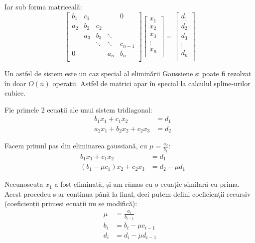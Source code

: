 \documentclass{exam}
\begin{document}
Iar sub forma matriceală:
\begin{equation*}
	\begin{bmatrix}
		b_1 & c_1 &        &        & 0         \\
		a_2 & b_2 & c_2    &        &           \\
		    & a_3 & b_3    & \ddots &           \\
		    &     & \ddots & \ddots & c_{n - 1} \\
		0   &     &        & a_n    & b_n       \\
	\end{bmatrix}
	\begin{bmatrix}
		x_1    \\
		x_2    \\
		x_3    \\
		\vdots \\
		x_n    \\
	\end{bmatrix}
	=
	\begin{bmatrix}
		d_1    \\
		d_2    \\
		d_3    \\
		\vdots \\
		d_n    \\
	\end{bmatrix}
\end{equation*}

Un astfel de sistem este un caz special al eliminării Gaussiene și poate fi
rezolvat în doar $O(n)$ operații. Astfel de matrici apar în special la calculul
spline-urilor cubice.

Fie primele 2 ecuații ale unui sistem tridiagonal:
\begin{align*}
	 & b_1 x_1 + c_1 x_2           & = d_1 \\
	 & a_2 x_1 + b_2 x_2 + c_2 x_3 & = d_2
\end{align*}

Facem primul pas din eliminarea gaussiană, cu $\mu = \frac{a_2}{b_1}$:
\begin{align*}
	 & b_1 x_1 + c_1 x_2             & = d_1           \\
	 & (b_1 - \mu c_1) x_2 + c_2 x_3 & = d_2 - \mu d_1
\end{align*}

Necunoscuta $x_1$ a fost eliminată, și am rămas cu o ecuație similară cu prima.
Acest procedeu s-ar continua până la final, deci putem defini coeficienții
recursiv (coeficienții primesi ecuații nu se modifică):
\begin{align*}
	\mu & = \frac{a_i}{b_{i - 1}} \\
	b_i & = b_i - \mu c_{i - 1}   \\
	d_i & = d_i - \mu d_{i - 1}
\end{align*}
\end{document}
